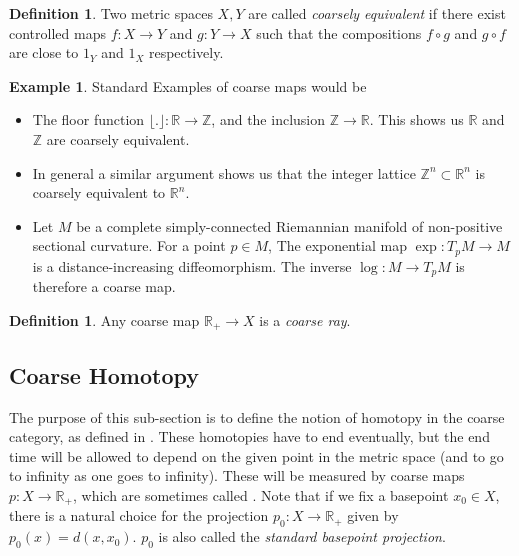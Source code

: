 \documentclass {amsart}
\newcommand {\R}        {\mathbb{R}}
\newcommand {\Z}        {\mathbb{Z}}
\newcommand {\Rplus}    {\mathbb{R}_{+}}
\theoremstyle {definition}
\newtheorem   {definition}  [theorem] {Definition}
\newtheorem   {example}  [theorem] {Example}
\begin{document}
\begin{definition} \label{def:close}
    Two metric spaces \( X,Y \) are called \emph{coarsely equivalent} if there
    exist controlled maps \( f : X \to Y \) and \( g : Y \to X \) such that the
    compositions \( f \circ g \) and \( g \circ f \) are close to \( 1_Y \) and
    \( 1_X \) respectively.
\end{definition}

\begin{example}
    Standard Examples of coarse maps would be
    \begin{itemize}
        \item The floor function \( \lfloor . \rfloor : \R \to \Z \), and the 
              inclusion \( \Z \to \R \). This shows us \( \R \) and \( \Z \) are 
              coarsely equivalent.

        \item In general a similar argument shows us that the integer lattice \(
              \Z^{n} \subset \R^{n} \) is coarsely equivalent to \( \R^{n} \).

        \item Let \( M \) be a complete simply-connected Riemannian manifold of
              non-positive sectional curvature. For a point \( p \in M \), The  
              exponential map \( \exp : T_p M \to M \) is a distance-increasing 
              diffeomorphism. The inverse \( \log : M \to T_p M \) is therefore a 
              coarse map.
    \end{itemize}
\end{example}

\begin{definition} \label{def:coarse-ray}
    Any coarse map \( \Rplus \to X \) is a \emph{coarse ray}.
\end{definition}

\subsection {Coarse Homotopy}

The purpose of this sub-section is to define the notion of homotopy in the
coarse category, as defined in \cite{mitchenerCoarseHomotopyGroups2020}. These
homotopies have to end eventually, but the end time will be allowed to depend
on the given point in the metric space (and to go to infinity as one goes to
infinity). These will be measured by coarse maps \( p : X \to \Rplus \), which
are sometimes called . Note that if we fix a
basepoint \( x_0 \in X \), there is a natural choice for the projection
\( p_0 : X \to \Rplus \) given by \( p_0 (x) = d(x, x_0) \). \( p_0 \) is also
called the \emph{standard basepoint projection}.
\end{document}
